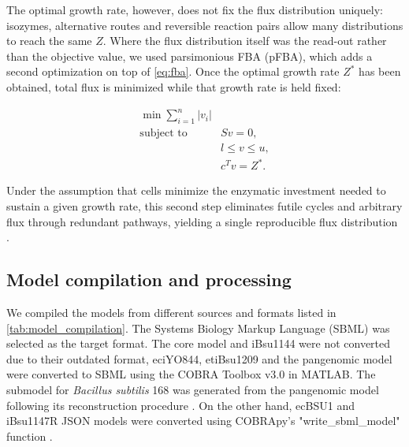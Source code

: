 \documentclass[11pt, a4paper]{article}
\begin{document}
The optimal growth rate, however, does not fix the flux distribution uniquely: isozymes, alternative routes and reversible reaction pairs allow many distributions to reach the same $Z$. Where the flux distribution itself was the read-out rather than the objective value, we used parsimonious FBA (pFBA), which adds a second optimization on top of \autoref{eq:fba}. Once the optimal growth rate $Z^{*}$ has been obtained, total flux is minimized while that growth rate is held fixed:

\begin{equation}
\begin{aligned}
\min \sum_{i=1}^{n} |v_i| \\
\text{subject to} \quad
& Sv = 0, \\
& l \leq v \leq u, \\
& c^{T}v = Z^{*}.
\end{aligned}
\end{equation}

Under the assumption that cells minimize the enzymatic investment needed to sustain a given growth rate, this second step eliminates futile cycles and arbitrary flux through redundant pathways, yielding a single reproducible flux distribution \parencite{holzhutter-2004}.

\subsection{Model compilation and processing}
We compiled the models from different sources and formats listed in \autoref{tab:model_compilation}. The Systems Biology Markup Language (SBML) was selected as the target format. The core model and iBsu1144 were not converted due to their outdated format, eciYO844, etiBsu1209 and the pangenomic model were converted to SBML using the COBRA Toolbox v3.0 in MATLAB. The submodel for \textit{Bacillus subtilis} 168 was generated from the pangenomic model following its reconstruction procedure \parencite{neal-2024}. On the other hand, ecBSU1 and iBsu1147R JSON models were converted using COBRApy’s "write\_sbml\_model" function \parencite{ebrahim-2013}. 
\end{document}
